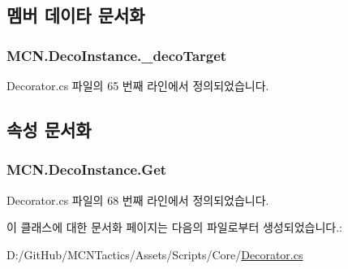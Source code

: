 \subsection{멤버 데이타 문서화}
\subsubsection[{\texorpdfstring{\+\_\+deco\+Target}{_decoTarget}}]{ M\+C\+N.\+Deco\+Instance.\+\_\+deco\+Target\hspace{0.3cm}{\ttfamily [private]}}\hypertarget{class_m_c_n_1_1_deco_instance_a5b829d23c217099a75a3193a9f60fba1}{}\label{class_m_c_n_1_1_deco_instance_a5b829d23c217099a75a3193a9f60fba1}


Decorator.\+cs 파일의 65 번째 라인에서 정의되었습니다.



\subsection{속성 문서화}
\subsubsection[{\texorpdfstring{Get}{Get}}]{ M\+C\+N.\+Deco\+Instance.\+Get\hspace{0.3cm}{\ttfamily [get]}}\hypertarget{class_m_c_n_1_1_deco_instance_af02857ad80446cb4fdd1bf982bda95c5}{}\label{class_m_c_n_1_1_deco_instance_af02857ad80446cb4fdd1bf982bda95c5}


Decorator.\+cs 파일의 68 번째 라인에서 정의되었습니다.



이 클래스에 대한 문서화 페이지는 다음의 파일로부터 생성되었습니다.\+:\begin{DoxyCompactItemize}
\item 
D\+:/\+Git\+Hub/\+M\+C\+N\+Tactics/\+Assets/\+Scripts/\+Core/\hyperlink{_decorator_8cs}{Decorator.\+cs}\end{DoxyCompactItemize}
